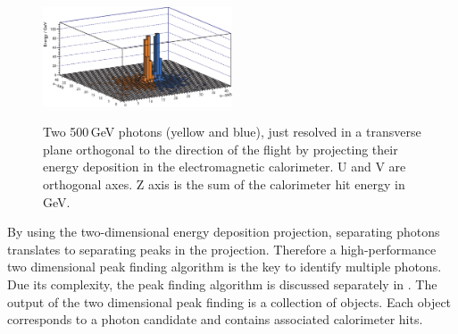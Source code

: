


\begin{figure}[tbph]
\centering
{\includegraphics[width=0.5\textwidth]{photon/peakFindingMod}}
\caption[Example of a projection of a large photon clusters containing two photons.]
{Two 500\,GeV photons (yellow and blue), just resolved in a transverse plane orthogonal to the direction of the flight  by projecting their energy deposition in the electromagnetic calorimeter. U and V are orthogonal axes. Z axis is the sum of the calorimeter hit energy in GeV.}
\label{fig:photonPeakFinding}
\end{figure}

By using the two-dimensional energy deposition projection, separating photons translates to separating peaks in the projection. Therefore a high-performance two dimensional peak finding algorithm is the key to identify multiple photons. Due its complexity, the peak finding algorithm is discussed separately in . The output of the two dimensional peak finding is a collection of \ShowerPeak objects. Each \ShowerPeak object corresponds to a photon candidate and contains associated calorimeter hits.

